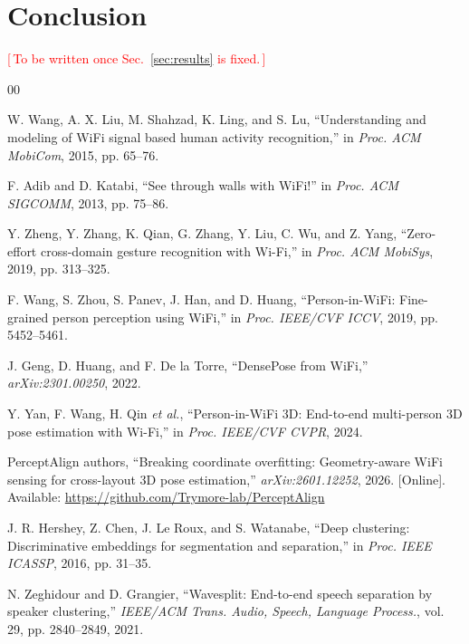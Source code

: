 \documentclass[conference]{IEEEtran}
\newcommand{\resultslot}[1]{\textcolor{red}{[\,#1\,]}}
\begin{document}
\section{Conclusion}
\label{sec:conclusion}

\resultslot{To be written once Sec.~\ref{sec:results} is fixed.}


\begin{thebibliography}{00}

 W. Wang, A. X. Liu, M. Shahzad, K. Ling, and S. Lu,
``Understanding and modeling of WiFi signal based human activity
recognition,'' in \emph{Proc. ACM MobiCom}, 2015, pp. 65--76.

 F. Adib and D. Katabi, ``See through walls with
WiFi!'' in \emph{Proc. ACM SIGCOMM}, 2013, pp. 75--86.

 Y. Zheng, Y. Zhang, K. Qian, G. Zhang, Y. Liu,
C. Wu, and Z. Yang, ``Zero-effort cross-domain gesture recognition with
Wi-Fi,'' in \emph{Proc. ACM MobiSys}, 2019, pp. 313--325.

 F. Wang, S. Zhou, S. Panev, J. Han, and
D. Huang, ``Person-in-WiFi: Fine-grained person perception using WiFi,'' in
\emph{Proc. IEEE/CVF ICCV}, 2019, pp. 5452--5461.

 J. Geng, D. Huang, and F. De la Torre,
``DensePose from WiFi,'' \emph{arXiv:2301.00250}, 2022.

 Y. Yan, F. Wang, H. Qin \emph{et al.},
``Person-in-WiFi 3D: End-to-end multi-person 3D pose estimation with Wi-Fi,''
in \emph{Proc. IEEE/CVF CVPR}, 2024.

 PerceptAlign authors, ``Breaking coordinate
overfitting: Geometry-aware WiFi sensing for cross-layout 3D pose
estimation,'' \emph{arXiv:2601.12252}, 2026. [Online]. Available:
\url{https://github.com/Trymore-lab/PerceptAlign}

 J. R. Hershey, Z. Chen, J. Le Roux, and
S. Watanabe, ``Deep clustering: Discriminative embeddings for segmentation and
separation,'' in \emph{Proc. IEEE ICASSP}, 2016, pp. 31--35.

 N. Zeghidour and D. Grangier, ``Wavesplit:
End-to-end speech separation by speaker clustering,'' \emph{IEEE/ACM Trans.
Audio, Speech, Language Process.}, vol. 29, pp. 2840--2849, 2021.


\end{thebibliography}
\end{document}
